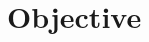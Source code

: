 \documentclass[12pt]{article}
\begin{document}
\section{Objective}

\begin{figure}

\end{figure}
\end{document}
